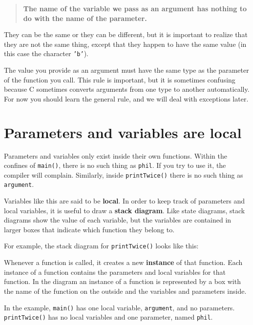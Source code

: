 \begin{quote}

{\bf The name of the variable we pass as an argument has nothing to do
with the name of the parameter.}

\end{quote}

They can be the same or they can be different, but it is important
to realize that they are not the same thing, except that they happen
to have the same value (in this case the character {\tt 'b'}).

The value you provide as an argument must have the same type as
the parameter of the function you call.  This rule is
important, but it is sometimes confusing because C sometimes
converts arguments from one type to another automatically.  For
now you should learn the general rule, and we will deal with
exceptions later.

\section {Parameters and variables are local}

Parameters and
variables only exist inside their own functions.  Within the
confines of {\tt main()}, there is no such thing as {\tt phil}.
If you try to use it, the compiler will complain.  Similarly,
inside {\tt printTwice()} there is no such thing as {\tt argument}.

Variables like this are said to be {\bf local}.  In order to
keep track of parameters and local variables, it is useful to
draw a {\bf stack diagram}.  Like state diagrams, stack diagrams
show the value of each variable, but the variables are contained
in larger boxes that indicate which function they belong to.

For example, the stack diagram for {\tt printTwice()} looks 
like this:

\vspace{0.1in}
\centerline{}
\vspace{0.1in}
%
Whenever a function is called, it creates a new {\bf instance}
of that function.  Each instance of a function contains the
parameters and local variables for that function.  In the
diagram an instance of a function is represented by a box
with the name of the function on the outside and the variables
and parameters inside.

In the example, {\tt main()} has one local variable, {\tt argument}, and
no parameters.  {\tt printTwice()} has no local variables and one
parameter, named {\tt phil}.

